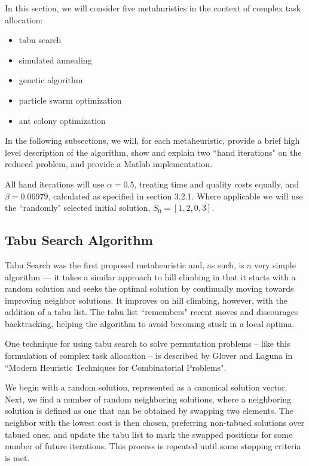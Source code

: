 \documentclass[a4paper]{article}
\begin{document}
In this section, we will consider five metahuristics in the context of complex task allocation:
\begin{itemize}
\item tabu search
\item simulated annealing
\item genetic algorithm
\item particle swarm optimization
\item ant colony optimization
\end{itemize}

In the following subsections, we will, for each metaheuristic, provide a brief
high level description of the algorithm, show and explain two ``hand iterations"
on the reduced problem, and provide a Matlab implementation.

All hand iterations will use $\alpha = 0.5$, treating time and quality costs
equally, and $\beta = 0.06979$, calculated as specified in section 3.2.1. Where applicable
we will use the ``randomly" selected initial solution, $S_0 = [ 1, 2, 0, 3 ]$.

\subsection{Tabu Search Algorithm} %

Tabu Search was the first proposed metaheuristic\cite{GloverTabu} and, as such, is a very simple algorithm --- it takes a similar approach to  hill climbing in that it starts with a random solution and seeks the optimal solution by continually moving towards improving neighbor solutions. It improves on hill climbing, however, with the addition of a tabu list. The tabu list ``remembers" recent moves and discourages backtracking, helping the algorithm to avoid becoming stuck in a local optima.

One technique for using tabu search to solve permutation problems -- like this formulation of complex task allocation -- is described by Glover and Laguna in ``Modern Heuristic Techniques for Combinatorial Problems"\cite{GloverModern}.

We begin with a random solution, represented as a canonical solution vector. Next, we find a number of random neighboring solutions, where a neighboring solution is defined as one that can be obtained by swapping two elements. The neighbor with the lowest cost is then chosen, preferring non-tabued solutions over tabued ones, and update the tabu list to mark the swapped positions for some number of future iterations. This process is repeated until some stopping criteria is met.
\end{document}
